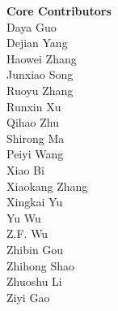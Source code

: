 \documentclass[11pt, a4paper, logo, copyright, nonumbering]{deepseek}
\begin{document}
\begin{multicols}{2} %
\noindent
\textbf{\color{damaired} Core Contributors} \\
\color{damaired} Daya Guo \\
\color{damaired} Dejian Yang \\
\color{damaired} Haowei Zhang \\
\color{damaired} Junxiao Song \\
\color{damaired} Ruoyu Zhang \\
\color{damaired} Runxin Xu \\
\color{damaired} Qihao Zhu \\
\color{damaired} Shirong Ma \\
\color{damaired} Peiyi Wang \\
\color{damaired} Xiao Bi \\
\color{damaired} Xiaokang Zhang \\
\color{damaired} Xingkai Yu \\
\color{damaired} Yu Wu \\
\color{damaired} Z.F. Wu \\
\color{damaired} Zhibin Gou \\
\color{damaired} Zhihong Shao \\
\color{damaired} Zhuoshu Li \\
\color{damaired} Ziyi Gao \\


\end{multicols}
\end{document}
